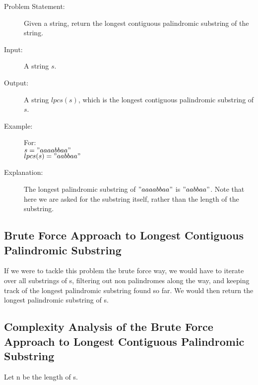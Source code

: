 \begin{description}
    \item[Problem Statement:]
        Given a string, return the longest contiguous palindromic substring of the string.

    \item[Input:] 
        A string $s$.
        
    \item[Output:] 
        A string $lpcs(s)$, which is the longest contiguous palindromic substring of $s$.
        
    \item[Example:] For:\\
        $s = "aaaabbaa"$\\
        $lpcs(s) = "aabbaa"$

    \item[Explanation:]
        The longest palindromic substring of $"aaaabbaa"$ is $"aabbaa"$.
        Note that here we are asked for the substring itself, rather than the length of the substring.
   
\end{description}

\subsection{Brute Force Approach to Longest Contiguous Palindromic Substring}
If we were to tackle this problem the brute force way, we would have to iterate over all substrings of s, filtering out non palindromes along the way,
and keeping track of the longest palindromic substring found so far. 
We would then return the longest palindromic substring of s.

\subsection{Complexity Analysis of the Brute Force Approach to Longest Contiguous Palindromic Substring}
Let n be the length of s.

